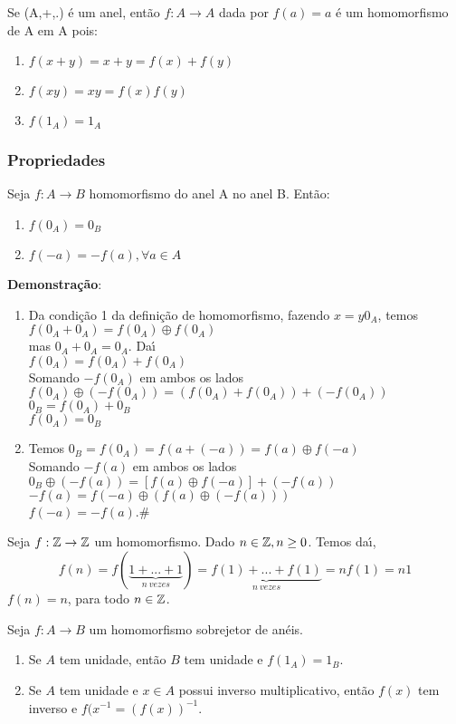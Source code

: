 Se (A,+,.) {\'e} um anel, ent{\~a}o $f:A\rightarrow A$ dada por $f(a)=a$ {\'e} um homomorfismo de A em A pois:
\begin{enumerate}
\item $f(x+y)=x+y=f(x)+f(y)$
\item $f(xy)=xy=f(x)f(y)$
\item $f(1_{A})=1_{A}$
\end{enumerate}

\subsubsection{Propriedades}
\begin{proposicao} Seja $f:A\rightarrow B$ homomorfismo do anel A no anel B. Ent{\~a}o:
\begin{enumerate}
\item $f(0_{A})=0_{B}$
\item $f(-a)=-f(a),\forall a\in A$
\end{enumerate}
\end{proposicao}

\textbf{Demonstra{\c c}{\~a}o}:
\begin{enumerate}
\item Da condi{\c c}{\~a}o 1 da defini{\c c}{\~a}o de homomorfismo, fazendo $x=y0_{A}$, temos\\
$f(0_{A}+0_{A})=f(0_{A})\oplus f(0_{A})$\\
mas $0_{A}+0_{A}=0_{A}$. Da{\'\i}\\
$f(0_{A})=f(0_{A})+f(0_{A})$\\
Somando $-f(0_{A})$ em ambos os lados\\
$f(0_{A})\oplus(-f(0_{A}))=(f(0_{A})+f(0_{A}))+(-f(0_{A}))$\\
$0_{B}=f(0_{A})+0_{B}$\\
$f(0_{A})=0_{B}$
\item Temos $0_{B}=f(0_{A})=f(a+(-a))=f(a)\oplus f(-a)$\\
Somando $-f(a)$ em ambos os lados\\
$0_{B}\oplus(-f(a))=[f(a)\oplus f(-a)]+(-f(a))$
$-f(a)=f(-a)\oplus(f(a)\oplus(-f(a)))$\\
$f(-a)=-f(a)$.\#
\end{enumerate}

Seja $f:\mathbb{Z}\rightarrow\mathbb{Z}$ um homomorfismo. Dado $n\in\mathbb{Z},n\geq 0$. Temos da{\'\i}, \[f(n)=f(\underbrace{1+...+1}_{n\ vezes})=\underbrace{f(1)+...+f(1)}_{n\ vezes}=nf(1)=n1\]
$f(n)=n$, para todo $n \in \mathbb{Z}$.

\begin{proposicao}
	Seja $f : A \to B$ um homomorfismo sobrejetor de an\'eis.
	\begin{enumerate}
		\item Se $A$ tem unidade, ent\~ao $B$ tem unidade e $f(1_A) = 1_B$.
		\item Se $A$ tem unidade e $x \in A$ possui inverso multiplicativo, ent\~ao $f(x)$ tem inverso e $f(x^{-1} = (f(x))^{-1}$.
	\end{enumerate}
\end{proposicao}

